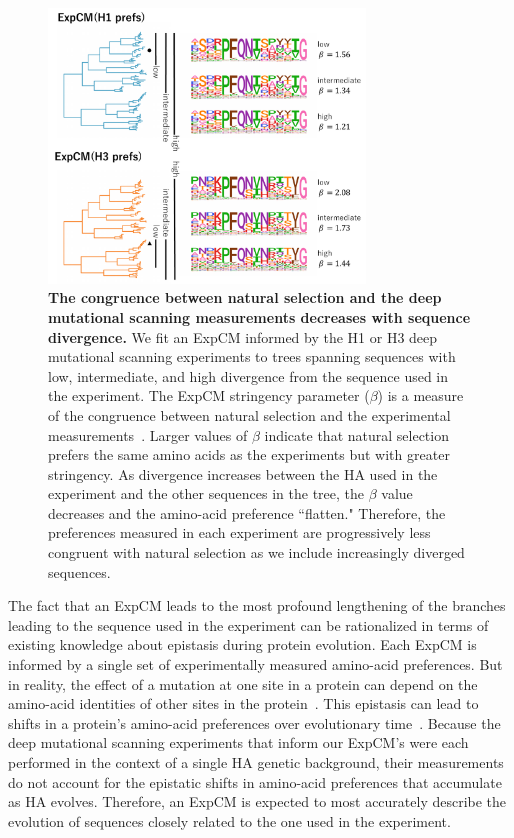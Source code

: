 \documentclass[11pt]{article}
\begin{document}
\begin{figure}
\centerline{\includegraphics[width=0.75\textwidth]{figures/compete}}
\caption{\label{fig:compete}
\textbf{The congruence between natural selection and the deep mutational scanning measurements decreases with sequence divergence.} 
We fit an ExpCM informed by the H1 or H3 deep mutational scanning experiments to trees spanning sequences with low, intermediate, and high divergence from the sequence used in the experiment. 
The ExpCM stringency parameter ($\beta$) is a measure of the congruence between natural selection and the experimental measurements~\citep{bloom2014informed,hilton2017phydms}. 
Larger values of $\beta$ indicate that natural selection prefers the same amino acids as the experiments but with greater stringency. 
As divergence increases between the HA used in the experiment and the other sequences in the tree, the $\beta$ value decreases and the amino-acid preference ``flatten."
Therefore, the preferences measured in each experiment are progressively less congruent with natural selection as we include increasingly diverged sequences. 
}
\end{figure}

The fact that an ExpCM leads to the most profound lengthening of the branches leading to the sequence used in the experiment can be rationalized in terms of existing knowledge about epistasis during protein evolution.
Each ExpCM is informed by a single set of experimentally measured amino-acid preferences.
But in reality, the effect of a mutation at one site in a protein can depend on the amino-acid identities of other sites in the protein~\citep{ortlund2007crystal, gong2013stability, harms2014historical, tufts2014epistasis, starr2018pervasive}. 
This epistasis can lead to shifts in a protein's amino-acid preferences over evolutionary time~\citep{pollock2012amino, doud2015site, shah2015contingency, bazykin2015changing, haddox2017mapping}.
Because the deep mutational scanning experiments that inform our ExpCM's were each performed in the context of a single HA genetic background, their measurements do not account for the epistatic shifts in amino-acid preferences that accumulate as HA evolves. 
Therefore, an ExpCM is expected to most accurately describe the evolution of sequences closely related to the one used in the experiment.
 
\end{document}
